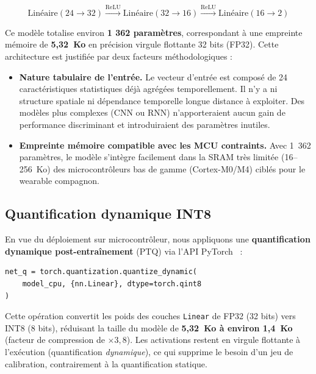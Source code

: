 \documentclass{article}
\begin{document}
\begin{equation}
  \text{Lin\'eaire}(24 \to 32) \xrightarrow{\text{ReLU}}
  \text{Lin\'eaire}(32 \to 16) \xrightarrow{\text{ReLU}}
  \text{Lin\'eaire}(16 \to 2)
  \label{eq:mlp}
\end{equation}

Ce modèle totalise environ \textbf{1 362 paramètres}, correspondant à une empreinte
mémoire de \textbf{5,32~Ko} en précision virgule flottante 32 bits (FP32). Cette
architecture est justifiée par deux facteurs méthodologiques :

\begin{itemize}
  \item \textbf{Nature tabulaire de l'entrée.} Le vecteur d'entrée est composé de
  24 caractéristiques statistiques déjà agrégées temporellement. Il n'y a ni structure
  spatiale ni dépendance temporelle longue distance à exploiter. Des modèles plus
  complexes (CNN ou RNN) n'apporteraient aucun gain de performance discriminant et
  introduiraient des paramètres inutiles.
  \item \textbf{Empreinte mémoire compatible avec les MCU contraints.} Avec 1~362
  paramètres, le modèle s'intègre facilement dans la SRAM très limitée (16--256~Ko)
  des microcontrôleurs bas de gamme (Cortex-M0/M4) ciblés pour le wearable compagnon.
\end{itemize}

\subsection{Quantification dynamique INT8}
\label{subsec:quantization}

En vue du déploiement sur microcontrôleur, nous appliquons une \textbf{quantification
dynamique post-entraînement} (PTQ) via l'API PyTorch~\cite{paszke2019pytorch} :

\begin{verbatim}
net_q = torch.quantization.quantize_dynamic(
    model_cpu, {nn.Linear}, dtype=torch.qint8
)
\end{verbatim}

Cette opération convertit les poids des couches \texttt{Linear} de FP32 (32 bits) vers
INT8 (8 bits), réduisant la taille du modèle de \textbf{5,32~Ko à environ 1,4~Ko}
(facteur de compression de $\times 3{,}8$). Les activations restent en virgule flottante
à l'exécution (quantification \textit{dynamique}), ce qui supprime le besoin d'un jeu
de calibration, contrairement à la quantification statique.
\end{document}

